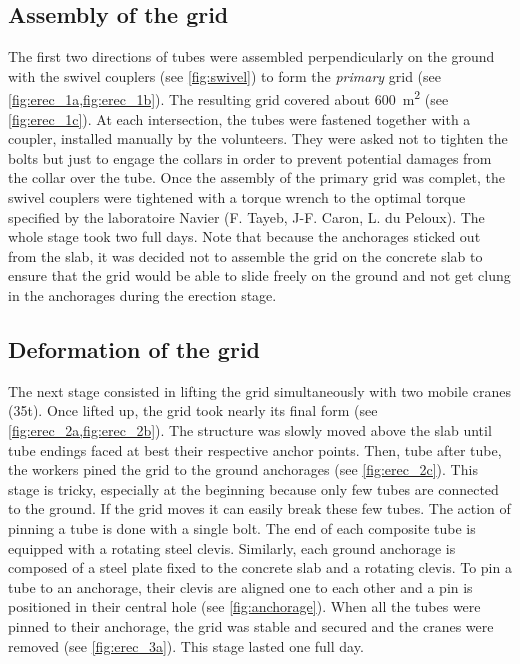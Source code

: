 \subsection{Assembly of the grid}
The first two directions of tubes were assembled perpendicularly on the ground with the swivel couplers (see \cref{fig:swivel}) to form the \emph{primary} grid (see \cref{fig:erec_1a,fig:erec_1b}). The resulting grid covered about 600~m\textsuperscript{2} (see \cref{fig:erec_1c}). At each intersection, the tubes were fastened together with a coupler, installed manually by the volunteers. They were asked not to tighten the bolts but just to engage the collars in order to prevent potential damages from the collar over the tube. Once the assembly of the primary grid was complet, the swivel couplers were tightened with a torque wrench to the optimal torque specified by the laboratoire Navier (F. Tayeb, J-F. Caron, L. du Peloux). The whole stage took two full days. Note that because the anchorages sticked out from the slab, it was decided not to assemble the grid on the concrete slab to ensure that the grid would be able to slide freely on the ground and not get clung in the anchorages during the erection stage.

\subsection{Deformation of the grid}
The next stage consisted in lifting the grid simultaneously with two mobile cranes (35t). Once lifted up, the grid took nearly its final form (see \cref{fig:erec_2a,fig:erec_2b}). The structure was slowly moved above the slab until tube endings faced at best their respective anchor points. Then, tube after tube, the workers pined the grid to the ground anchorages (see \cref{fig:erec_2c}). This stage is tricky, especially at the beginning because only few tubes are connected to the ground. If the grid moves it can easily break these few tubes. The action of pinning a tube is done with a single bolt. The end of each composite tube is equipped with a rotating steel clevis. Similarly, each ground anchorage is composed of a steel plate fixed to the concrete slab and a rotating clevis. To pin a tube to an anchorage, their clevis are aligned one to each other and a pin is positioned in their central hole (see \cref{fig:anchorage}). When all the tubes were pinned to their anchorage, the grid was stable and secured and the cranes were removed (see \cref{fig:erec_3a}). This stage lasted one full day.

